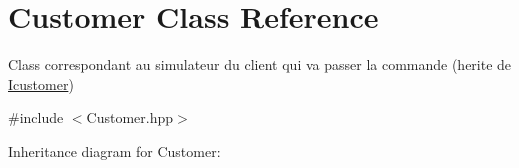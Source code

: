 \hypertarget{classCustomer}{}\section{Customer Class Reference}
\label{classCustomer}


Class correspondant au simulateur du client qui va passer la commande (herite de \hyperlink{classIcustomer}{Icustomer})  




{\ttfamily \#include $<$Customer.\+hpp$>$}



Inheritance diagram for Customer\+:
